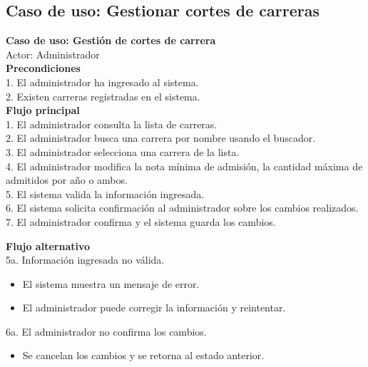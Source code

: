 \documentclass[12pt,a4paper]{article}
\begin{document}
\subsection{Caso de uso: Gestionar cortes de carreras}
\begin{tcolorbox}[colback=white, colframe=black, rounded corners]
  {\Large \textbf{Caso de uso: Gestión de cortes de carrera}} \\
  {\large Actor: Administrador} \vspace*{0.5cm} \\
  {{\large \textbf{Precondiciones}} \\
  1. El administrador ha ingresado al sistema. \\
  2. Existen carreras registradas en el sistema.
  } \vspace*{0.5cm} \\
  {{\large \textbf{Flujo principal}} \\
  1. El administrador consulta la lista de carreras. \\
  2. El administrador busca una carrera por nombre usando el buscador. \\
  3. El administrador selecciona una carrera de la lista. \\
  4. El administrador modifica la nota mínima de admisión, la cantidad máxima de admitidos por año o ambos. \\
  5. El sistema valida la información ingresada. \\
  6. El sistema solicita confirmación al administrador sobre los cambios realizados. \\
  7. El administrador confirma y el sistema guarda los cambios.
  } \vspace*{0.5cm} \\
  {{\large \textbf{Flujo alternativo}} \\
  5a. Información ingresada no válida.
  \begin{itemize}
    \item El sistema muestra un mensaje de error.
    \item El administrador puede corregir la información y reintentar.
  \end{itemize}
  6a. El administrador no confirma los cambios.
  \begin{itemize}
    \item Se cancelan los cambios y se retorna al estado anterior.
  \end{itemize}
}
\end{tcolorbox}
\end{document}

